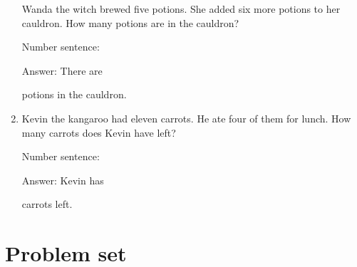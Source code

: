 \documentclass{tufte-book}
\begin{document}
\begin{enumerate}
  Wanda the witch brewed five potions. She added six more potions to her
  cauldron. How many potions are in the cauldron?\medskip\par
  Number sentence:
  \dotfill\medskip\par
  Answer: There are
  \dotfill\medskip\par\mbox{}\dotfill\medskip\par\mbox{}\dotfill\bigskip
  potions in the cauldron.
\item
  Kevin the kangaroo had eleven carrots. He ate four of them for lunch.
  How many carrots does Kevin have left?\medskip\par
  Number sentence:
  \dotfill\medskip\par
  Answer: Kevin has
  \dotfill\medskip\par\mbox{}\dotfill\medskip\par\mbox{}\dotfill\bigskip
  carrots left.
\end{enumerate}



\clearpage\section{Problem set }
\end{document}
